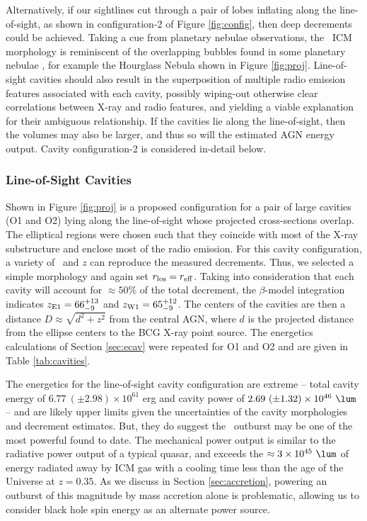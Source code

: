 \documentclass[11pt, preprint]{aastex}
\begin{document}
Alternatively, if our sightlines cut through a pair of lobes inflating
along the line-of-sight, as shown in configuration-2 of Figure
\ref{fig:config}, then deep decrements could be achieved. Taking a cue
from planetary nebulae observations, the \rbs\ ICM morphology is
reminiscent of the overlapping bubbles found in some planetary nebulae
\citep{1999AJ....118..468S}, for example the Hourglass Nebula shown in
Figure \ref{fig:proj}. Line-of-sight cavities should also result in
the superposition of multiple radio emission features associated with
each cavity, possibly wiping-out otherwise clear correlations between
X-ray and radio features, and yielding a viable explanation for their
ambiguous relationship. If the cavities lie along the line-of-sight,
then the volumes may also be larger, and thus so will the estimated
AGN energy output. Cavity configuration-2 is considered in-detail
below.

\subsubsection{Line-of-Sight Cavities}

Shown in Figure \ref{fig:proj} is a proposed configuration for a pair
of large cavities (O1 and O2) lying along the line-of-sight whose
projected cross-sections overlap. The elliptical regions were chosen
such that they coincide with most of the X-ray substructure and
enclose most of the radio emission. For this cavity configuration, a
variety of \rlos\ and $z$ can reproduce the measured decrements. Thus,
we selected a simple morphology and again set $r_{\rm{los}} = r_{\rm{eff}}$. Taking
into consideration that each cavity will account for $\approx 50\%$ of
the total decrement, the $\beta$-model integration indicates
$z_{\rm{E1}} = 66^{+13}_{-9}$ and $z_{\rm{W1}} = 65^{+12}_{-9}$. The
centers of the cavities are then a distance $D \approx \sqrt{d^2+z^2}$
from the central AGN, where $d$ is the projected distance from the
ellipse centers to the BCG X-ray point source. The energetics
calculations of Section \ref{sec:ecav} were repeated for O1 and O2 and
are given in Table \ref{tab:cavities}.

The energetics for the line-of-sight cavity configuration are extreme
-- total cavity energy of $6.77 ~(\pm 2.98) \times 10^{61}$ erg and
cavity power of $2.69 ~(\pm 1.32) \times 10^{46} ~\lum$ -- and are
likely upper limits given the uncertainties of the cavity morphologies
and decrement estimates. But, they do suggest the \rbs\ outburst may
be one of the most powerful found to date. The mechanical power output
is similar to the radiative power output of a typical quasar, and
exceeds the $\approx 3 \times 10^{45} ~\lum$ of energy radiated away
by ICM gas with a cooling time less than the age of the Universe at
$z=0.35$. As we discuss in Section \ref{sec:accretion}, powering an
outburst of this magnitude by mass accretion alone is problematic,
allowing us to consider black hole spin energy as an alternate power
source.
\end{document}
